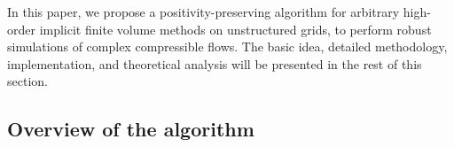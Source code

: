 In this paper, we propose a positivity-preserving algorithm for arbitrary high-order implicit finite volume methods on unstructured grids, to perform robust simulations of complex compressible flows. The basic idea, detailed methodology, implementation, and theoretical analysis will be presented in the rest of this section.

%

\subsection{Overview of the algorithm}


